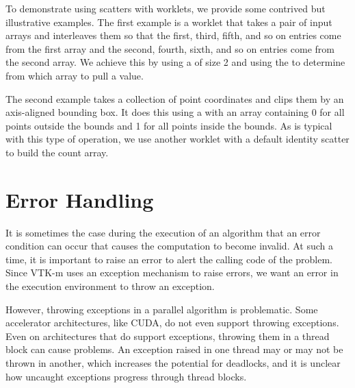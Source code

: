 To demonstrate using scatters with worklets, we provide some contrived but
illustrative examples. The first example is a worklet that takes a pair of
input arrays and interleaves them so that the first, third, fifth, and so
on entries come from the first array and the second, fourth, sixth, and so
on entries come from the second array. We achieve this by using a
 of size 2 and using the  to
determine from which array to pull a value.


The second example takes a collection of point coordinates and clips them
by an axis-aligned bounding box. It does this using a
 with an array containing 0 for all points
outside the bounds and 1 for all points inside the bounds. As is typical
with this type of operation, we use another worklet with a default identity
scatter to build the count array.




\section{Error Handling}
\label{sec:ExecutionEnvironment:ErrorHandling}
\label{sec:Worklet:ErrorHandling}



It is sometimes the case during the execution of an algorithm that an error
condition can occur that causes the computation to become invalid. At such
a time, it is important to raise an error to alert the calling code of the
problem. Since VTK-m uses an exception mechanism to raise errors, we want
an error in the execution environment to throw an exception.

However, throwing exceptions in a parallel algorithm is problematic. Some
accelerator architectures, like CUDA, do not even support throwing
exceptions. Even on architectures that do support exceptions, throwing them
in a thread block can cause problems. An exception raised in one thread may
or may not be thrown in another, which increases the potential for
deadlocks, and it is unclear how uncaught exceptions progress through
thread blocks.

